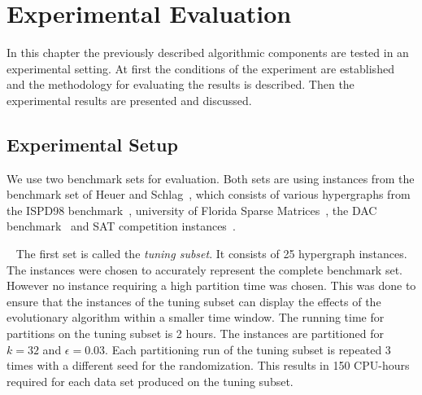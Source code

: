 \documentclass[a4paper,12pt,titlepage, BCOR7mm,headsepline]{scrbook}
\numberwithin{equation}{section}
\begin{document}
\chapter{Experimental Evaluation}
\label{chapter:experimentalevaluation}
In this chapter the previously described algorithmic components are tested in an experimental setting. At first the conditions of the experiment are established and the methodology for evaluating the results is described. Then the experimental results are presented and discussed. 



\section{Experimental Setup}
\label{sec:experimental_setup}
We use two benchmark sets for evaluation. Both sets are using instances from the benchmark set of Heuer and Schlag~\cite{heuer2017improving}, which consists of various hypergraphs from the ISPD98 benchmark~\cite{alpert1998ispd98}, university of Florida Sparse Matrices~\cite{davis2011university}, the DAC benchmark~\cite{viswanathan2012dac} and SAT competition instances~\cite{belov2014proceedings}. 



\newline ~\newline
The first set is called the \emph{tuning subset}. It consists of 25 hypergraph instances. The instances were chosen to accurately represent the complete benchmark set. However no instance requiring a high partition time was chosen. This was done to ensure that the instances of the tuning subset can display the effects of the evolutionary algorithm within a smaller time window. The running time for partitions on the tuning subset is 2 hours. The instances are partitioned for $k = 32$ and $\epsilon = 0.03$. Each partitioning run of the tuning subset is repeated 3 times with a different seed for the randomization. This results in 150 CPU-hours required for each data set produced on the tuning subset.
\newline
\end{document}
